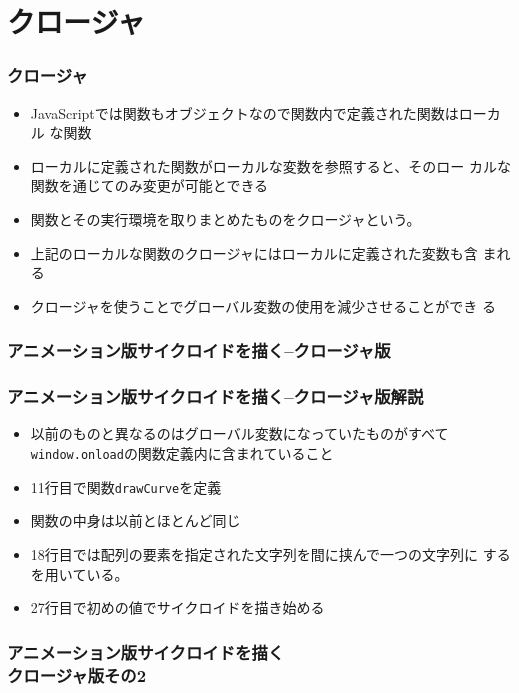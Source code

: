 \section{クロージャ}
\begin{frame}[containsverbatim]
 \frametitle{クロージャ}
\begin{itemize}
	 \item  JavaScriptでは関数もオブジェクトなので関数内で定義された関数はローカル
 な関数
	 \item ローカルに定義された関数がローカルな変数を参照すると、そのロー
				 カルな関数を通じてのみ変更が可能とできる
 \item 関数とその実行環境を取りまとめたものをクロージャという。
 \item 上記のローカルな関数のクロージャにはローカルに定義された変数も含
			 まれる
 \item クロージャを使うことでグローバル変数の使用を減少させることができ
			 る
	\end{itemize}
\end{frame}
\begin{frame}[containsverbatim]
 \frametitle{アニメーション版サイクロイドを描く--クロージャ版}
\end{frame}
\begin{frame}[containsverbatim]
 \frametitle{アニメーション版サイクロイドを描く--クロージャ版解説}
 \begin{itemize}
	\item 以前のものと異なるのはグローバル変数になっていたものがすべて
				\Verb+window.onload+の関数定義内に含まれていること
	\item 11行目で関数\Verb+drawCurve+を定義
	\item 関数の中身は以前とほとんど同じ
	\item 18行目では配列の要素を指定された文字列を間に挟んで一つの文字列に
				するを用いている。
	\item 27行目で初めの値でサイクロイドを描き始める
 \end{itemize}
\end{frame}
\begin{frame}[containsverbatim]
 \frametitle{アニメーション版サイクロイドを描く\\クロージャ版その2}
\end{frame}
